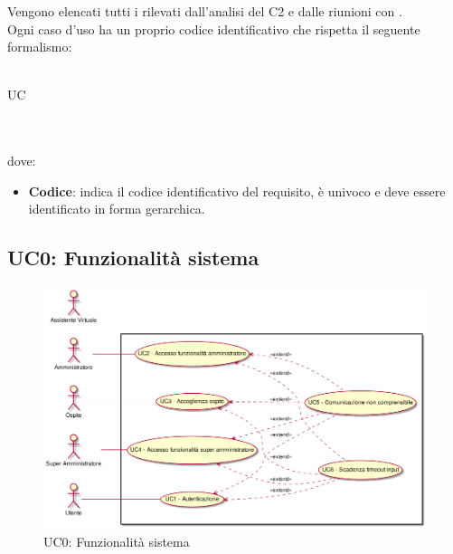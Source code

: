 \documentclass[AdR.tex]{subfiles}
\begin{document}
Vengono elencati tutti i  rilevati dall'analisi del  C2 e dalle riunioni con \PROPONENTE. \\
Ogni caso d'uso ha un proprio codice identificativo  che rispetta il seguente formalismo:\\ \\
\centerline{UC\textbraceright{}}
\\ \\dove:
\begin{itemize}
	\item \textbf{Codice}: indica il codice identificativo del requisito, è univoco e deve essere identificato in forma gerarchica.
\end{itemize}


\newpage
\subsection{UC0: Funzionalità sistema}
\label{UC0}
\begin{figure}[h]
\centering
\includegraphics[width=\textwidth,height=\textheight,keepaspectratio]{images/UseCase.png}
\caption{UC0: Funzionalità sistema}
\end{figure}
\end{document}

